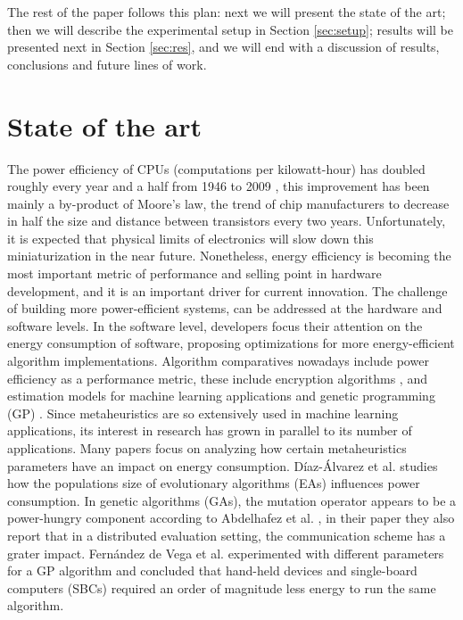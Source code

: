 \documentclass[a4paper,twoside]{article}
\begin{document}
The rest of the paper follows this plan: next we will present the state of the
art; then we will describe the experimental setup in Section \ref{sec:setup};
results will be presented next in Section \ref{sec:res}, and we will end with a
discussion of results, conclusions and future lines of work.

\section{State of the art}


The power efficiency of CPUs (computations per kilowatt-hour) has doubled
roughly every year and a half from 1946 to 2009 \cite{koomey2011web}, this
improvement has been mainly a by-product of Moore's law, the trend of chip
manufacturers to decrease in half the size and distance between transistors
every two years. Unfortunately, it is expected that physical limits of
electronics will slow down this miniaturization in the near future.
Nonetheless, energy efficiency is becoming the most important metric of
performance and selling point in hardware development, and it is an important
driver for current innovation. The challenge of building more power-efficient
systems, can be addressed at the hardware and software levels. In the software
level, developers focus their attention on the energy consumption of software,
proposing optimizations for more energy-efficient algorithm implementations.
Algorithm comparatives nowadays include power efficiency as a performance metric,
these include encryption algorithms
\cite{mota2017comparative,thakor2021lightweight}, and estimation models for
machine learning applications \cite{garcia2019estimation} and genetic
programming (GP) \cite{diaz2018fuzzy}. Since metaheuristics are so extensively
used in machine learning applications, its interest in research has grown in
parallel to its number of applications. Many papers focus on analyzing how
certain metaheuristics parameters have an impact on energy consumption.
Díaz-Álvarez et al. \cite{diaz2022population} studies how the populations size
of evolutionary algorithms (EAs) influences power consumption. In genetic algorithms (GAs), the
mutation operator appears to be a power-hungry component according to
Abdelhafez et al. \cite{abdelhafez2019component}, in their paper they also
report that in a distributed evaluation setting, the communication scheme has a
grater impact. Fernández de Vega et al. \cite{10.1007/978-3-319-45823-6_51}
experimented with different parameters for a GP algorithm and concluded that
hand-held devices and single-board computers (SBCs) required an order of
magnitude less energy to run the same algorithm. 
\end{document}
